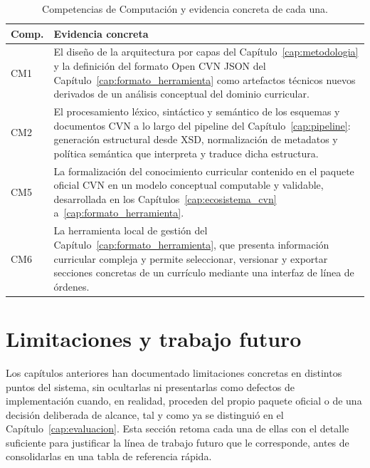 \begin{table}[htbp]
  \centering
  \small
  \renewcommand{\arraystretch}{1.2}
  \begin{tabular}{p{} p{}}
    \hline
    \textbf{Comp.} & \textbf{Evidencia concreta} \\
    \hline
    CM1 & El diseño de la arquitectura por capas del
    Capítulo~\ref{cap:metodologia} y la definición del formato Open CVN JSON
    del Capítulo~\ref{cap:formato_herramienta} como artefactos técnicos
    nuevos derivados de un análisis conceptual del dominio curricular. \\
    CM2 & El procesamiento léxico, sintáctico y semántico de los esquemas y
    documentos CVN a lo largo del pipeline del
    Capítulo~\ref{cap:pipeline}: generación estructural desde XSD,
    normalización de metadatos y política semántica que interpreta
    y traduce dicha estructura. \\
    CM5 & La formalización del conocimiento curricular contenido en el
    paquete oficial CVN en un modelo conceptual computable y validable,
    desarrollada en los Capítulos~\ref{cap:ecosistema_cvn}
    a~\ref{cap:formato_herramienta}. \\
    CM6 & La herramienta local de gestión del
    Capítulo~\ref{cap:formato_herramienta}, que presenta información
    curricular compleja y permite seleccionar, versionar y exportar
    secciones concretas de un currículo mediante una interfaz de línea de
    órdenes. \\
    \hline
  \end{tabular}
  \caption{Competencias de Computación y evidencia concreta de cada una.}
  \label{tab:conclusiones_competencias}
\end{table}

\section{Limitaciones y trabajo futuro}
\label{sec:conclusiones_limitaciones}

Los capítulos anteriores han documentado limitaciones concretas en distintos
puntos del sistema, sin ocultarlas ni presentarlas como defectos de
implementación cuando, en realidad, proceden del propio paquete oficial o de
una decisión deliberada de alcance, tal y como ya se distinguió en el
Capítulo~\ref{cap:evaluacion}. Esta sección retoma cada una de ellas con el
detalle suficiente para justificar la línea de trabajo futuro que le
corresponde, antes de consolidarlas en una tabla de referencia rápida.

